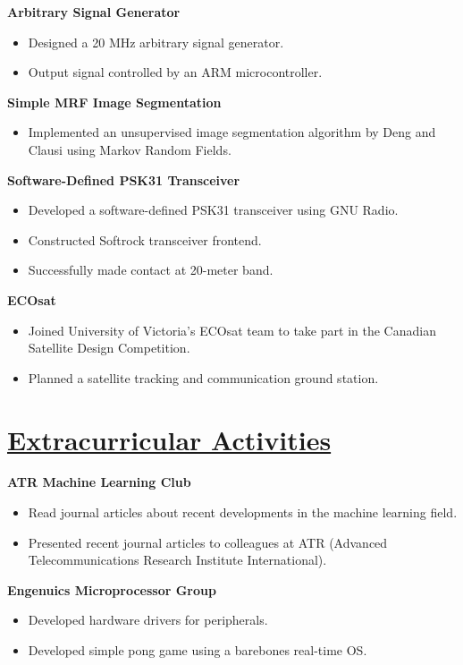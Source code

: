 \documentclass[a4paper, 11pt]{article}
\begin{document}
  \textbf{Arbitrary Signal Generator}  
  \begin{itemize}[nosep]
    \item Designed a 20 MHz arbitrary signal generator.
    \item Output signal controlled by an ARM microcontroller.    
  \end{itemize}
  \medskip
  
  \textbf{Simple MRF Image Segmentation}
  \begin{itemize}[nosep]
    \item Implemented an unsupervised image segmentation algorithm by Deng and Clausi using Markov Random Fields.
  \end{itemize}
  \medskip

  \textbf{Software-Defined PSK31 Transceiver}
  \begin{itemize}[nosep]
    \item Developed a software-defined PSK31 transceiver using GNU Radio.
    \item Constructed Softrock transceiver frontend.
    \item Successfully made contact at 20-meter band.
  \end{itemize}
  \medskip
  
  \textbf{ECOsat}
  \begin{itemize}[nosep]
    \item Joined University of Victoria's ECOsat team to take part in the Canadian Satellite Design Competition.
    \item Planned a satellite tracking and communication ground station.
  \end{itemize}
  
\section{\underline{Extracurricular Activities}}
  \textbf{ATR Machine Learning Club}
  \begin{itemize}[nosep]
    \item Read journal articles about recent developments in the machine learning field.
    \item Presented recent journal articles to colleagues at ATR (Advanced Telecommunications Research Institute International).
  \end{itemize}
  \medskip
      
  \textbf{Engenuics Microprocessor Group}
  \begin{itemize}[nosep]
    \item Developed hardware drivers for peripherals.
    \item Developed simple pong game using a barebones real-time OS.
  \end{itemize}
  \medskip
      
\end{document}
